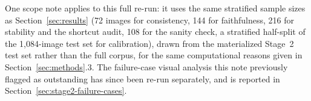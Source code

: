 One scope note applies to this full re-run: it uses the same stratified sample sizes as Section~\ref{sec:results} (72 images for consistency, 144 for faithfulness, 216 for stability and the shortcut audit, 108 for the sanity check, a stratified half-split of the 1,084-image test set for calibration), drawn from the materialized Stage~2 test set rather than the full corpus, for the same computational reasons given in Section~\ref{sec:methods}.3. The failure-case visual analysis this note previously flagged as outstanding has since been re-run separately, and is reported in Section~\ref{sec:stage2-failure-cases}.
